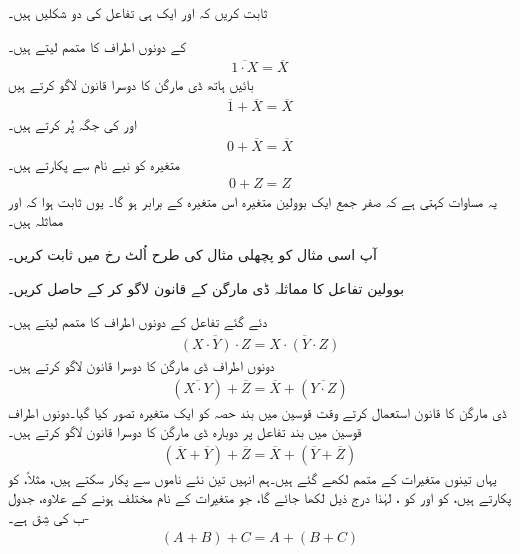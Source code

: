 ثابت کریں کہ   اور  ایک ہی تفاعل کی دو شکلیں ہیں۔

\quad
{}	کے دونوں  اطراف  کا  متمم لیتے ہیں۔
\begin{align*}
\overline{1\cdot X}=\overline{X}
\end{align*}
بائیں ہاتھ  ڈی مارگن کا دوسرا قانون لاگو کرتے ہیں
\begin{align*}
\overline{1}+\overline{X}=\overline{X}
\end{align*}
اور  کی جگہ  پُر  کرتے ہیں۔
\begin{align*}
0+\overline{X}=\overline{X}
\end{align*}
متغیرہ  کو نیے نام  سے پکارتے ہیں۔
\begin{align*}
0+Z=Z
\end{align*}
یہ مساوات کہتی ہے کہ صفر جمع ایک بوولین متغیرہ اس متغیرہ کے برابر ہو گا۔ یوں ثابت ہوا کہ  اور   مماثلہ  ہیں۔

آپ اسی مثال کو پچھلی مثال کی طرح اُلٹ رخ  میں ثابت کریں۔

 بوولین تفاعل   کا مماثلہ  ڈی مارگن کے قانون لاگو کر کے  حاصل کریں۔

\quad
دئے گئے تفاعل کے دونوں اطراف  کا  متمم  لیتے ہیں۔
\begin{align*}
\overline{(X\cdot Y)\cdot Z}=\overline{X\cdot(Y\cdot Z)}
\end{align*}
دونوں  اطراف  ڈی مارگن کا  دوسرا قانون  لاگو کرتے ہیں۔
\begin{align*}
(\overline{X\cdot Y})+\overline{Z}=\overline{X}+(\overline{Y\cdot Z})
\end{align*}
ڈی مارگن کا قانون استعمال کرتے وقت قوسین میں  بند حصہ کو ایک متغیرہ تصور کیا گیا۔دونوں اطراف  قوسین میں بند  تفاعل پر دوبارہ ڈی مارگن کا دوسرا قانون لاگو کرتے ہیں۔
\begin{align*}
(\overline{X}+\overline{ Y})+\overline{Z}=\overline{X}+(\overline{Y}+\overline{Z})
\end{align*}
یہاں تینوں متغیرات کے  متمم لکھے گئے ہیں۔ہم انہیں تین نئے ناموں سے پکار سکتے ہیں،  مثلاً، کو    پکارتے  ہیں،  کو  اور  کو ، لہٰذا درج ذیل لکھا جائے گا، جو متغیرات کے نام مختلف ہونے کے علاوہ،   جدول -ب  کی شِق  ہے۔
\begin{align*}
(A+B)+C=A+(B+C)
\end{align*}


